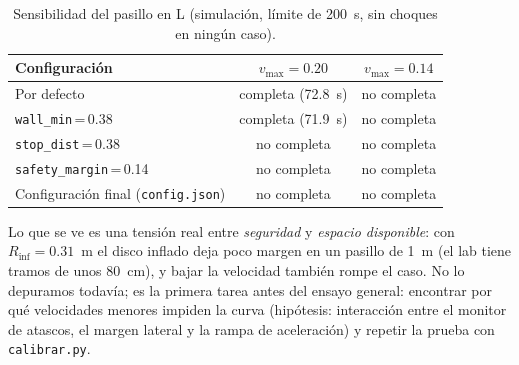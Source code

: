 \documentclass[11pt,a4paper]{article}
\newcommand{\cmd}[1]{\texttt{\small #1}}
\begin{document}
\begin{table}[H]
\centering\small
\begin{tabular}{@{}lcc@{}}
\toprule
\textbf{Configuraci\'on} & $v_{\max}=0.20$ & $v_{\max}=0.14$ \\
\midrule
Por defecto & completa (72.8~s) & \textcolor{rojo}{no completa} \\
\texttt{wall\_min}\,=\,0.38 & completa (71.9~s) & \textcolor{rojo}{no completa} \\
\texttt{stop\_dist}\,=\,0.38 & \textcolor{rojo}{no completa} & \textcolor{rojo}{no completa} \\
\texttt{safety\_margin}\,=\,0.14 & \textcolor{rojo}{no completa} & \textcolor{rojo}{no completa} \\
Configuraci\'on final (\texttt{config.json}) & \textcolor{rojo}{no completa} & \textcolor{rojo}{no completa} \\
\bottomrule
\end{tabular}
\caption{Sensibilidad del pasillo en L (simulaci\'on, l\'imite de 200~s, sin choques en ning\'un caso).}
\label{tab:L}
\end{table}

Lo que se ve es una tensi\'on real entre \emph{seguridad} y \emph{espacio disponible}: con $R_{\text{inf}}=0.31$~m el disco inflado deja poco margen en un pasillo de 1~m (el lab tiene tramos de unos 80~cm), y bajar la velocidad
tambi\'en rompe el caso. No lo depuramos todav\'ia; es la primera tarea antes del ensayo general: encontrar por qu\'e velocidades menores impiden la curva (hip\'otesis: interacci\'on entre el monitor de atascos, el
margen lateral y la rampa de aceleraci\'on) y repetir la prueba con \cmd{calibrar.py}.
\end{document}

